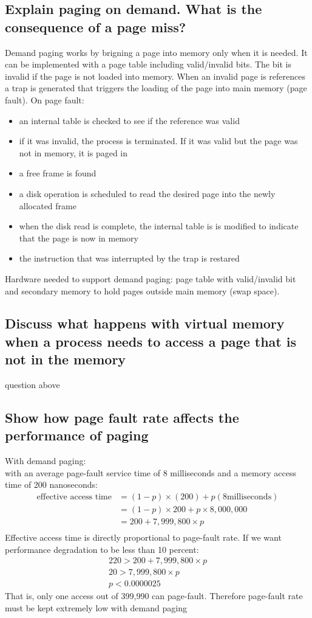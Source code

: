 \documentclass{article}
\begin{document}
\subsection{Explain paging on demand. What is the consequence of a page miss?}
Demand paging works by brigning a page into memory only when it is needed. It can be implemented with a page table including valid/invalid bits. The bit is invalid if the page is not loaded into memory. When an invalid page is references a trap is generated that triggers the loading of the page into main memory (page fault). On page fault:
\begin{itemize}
    \item an internal table is checked to see if the reference was valid
    \item if it was invalid, the process is terminated. If it was valid but the page was not in memory, it is paged in
    \item a free frame is found 
    \item a disk operation is scheduled to read the desired page into the newly allocated frame
    \item when the disk read is complete, the internal table is is modified to indicate that the page is now in memory
    \item the instruction that was interrupted by the trap is restared
\end{itemize}
Hardware needed to support demand paging: page table with valid/invalid bit and secondary memory to hold pages outside main memory (swap space).

\subsection{Discuss what happens with virtual memory when a process needs to access a page that is not in the memory}
question above

\subsection{Show how page fault rate affects the performance of paging}
With demand paging:\\
with an average page-fault service time of 8 milliseconds and a memory access time of 200 nanoseconds:
\begin{align*}
    \text{effective access time}&=(1-p)\times(200)+p(8 \text{milliseconds})\\
    &=(1-p)\times 200 + p \times 8,000,000\\
    &=200+7,999,800\times p\\
\end{align*}
Effective access time is directly proportional to page-fault rate. If we want performance degradation to be less than 10 percent:
\begin{align*}
    220>200+7,999,800\times p\\
    20>7,999,800\times p\\
    p<0.0000025
\end{align*}
That is, only one access out of 399,990 can page-fault. Therefore page-fault rate must be kept extremely low with demand paging
\end{document}
